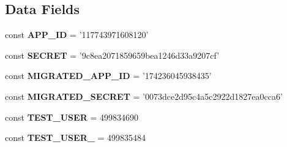 \subsection*{Data Fields}
\begin{DoxyCompactItemize}
\item 
\hypertarget{class_p_h_p_s_d_k_test_case_ad6af1153901af8a4a78aa790b7bb3fce}{const {\bfseries A\-P\-P\-\_\-\-I\-D} = '117743971608120'}\label{class_p_h_p_s_d_k_test_case_ad6af1153901af8a4a78aa790b7bb3fce}

\item 
\hypertarget{class_p_h_p_s_d_k_test_case_a21a8749d3ee3cf4e26cb97e1f76878f4}{const {\bfseries S\-E\-C\-R\-E\-T} = '9c8ea2071859659bea1246d33a9207cf'}\label{class_p_h_p_s_d_k_test_case_a21a8749d3ee3cf4e26cb97e1f76878f4}

\item 
\hypertarget{class_p_h_p_s_d_k_test_case_ad8b2a07d44f6a4fb519492871b89c6db}{const {\bfseries M\-I\-G\-R\-A\-T\-E\-D\-\_\-\-A\-P\-P\-\_\-\-I\-D} = '174236045938435'}\label{class_p_h_p_s_d_k_test_case_ad8b2a07d44f6a4fb519492871b89c6db}

\item 
\hypertarget{class_p_h_p_s_d_k_test_case_af5c4976d41e16c694daf4959a73d7927}{const {\bfseries M\-I\-G\-R\-A\-T\-E\-D\-\_\-\-S\-E\-C\-R\-E\-T} = '0073dce2d95c4a5c2922d1827ea0cca6'}\label{class_p_h_p_s_d_k_test_case_af5c4976d41e16c694daf4959a73d7927}

\item 
\hypertarget{class_p_h_p_s_d_k_test_case_a65c4a3d7948bde4672687f78ef248553}{const {\bfseries T\-E\-S\-T\-\_\-\-U\-S\-E\-R} = 499834690}\label{class_p_h_p_s_d_k_test_case_a65c4a3d7948bde4672687f78ef248553}

\item 
\hypertarget{class_p_h_p_s_d_k_test_case_a556605cd67755fac6c2648c2d0379883}{const {\bfseries T\-E\-S\-T\-\_\-\-U\-S\-E\-R\-\_} = 499835484}\label{class_p_h_p_s_d_k_test_case_a556605cd67755fac6c2648c2d0379883}

\end{DoxyCompactItemize}
